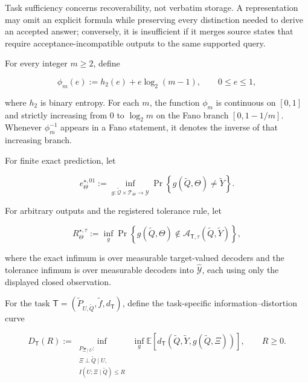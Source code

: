 \documentclass[10pt]{article} %
\providecommand{\1}{\mathbf{1}}  %
\theoremstyle{remark}
\theoremstyle{definition}
\begin{document}
Task sufficiency concerns recoverability, not verbatim storage. A representation may omit an explicit formula while preserving every distinction needed to derive an accepted answer; conversely, it is insufficient if it merges source states that require acceptance-incompatible outputs to the same supported query.

For every integer $m\geq2$, define

\begin{equation}
\phi_m(e)
:=
h_2(e)+e\log_2(m-1),
\qquad
0\leq e\leq1,
\label{eq:fano-curve}
\end{equation}

where $h_2$ is binary entropy. For each $m$, the function $\phi_m$ is continuous on $[0,1]$ and strictly increasing from $0$ to $\log_2m$ on the Fano branch $[0,1-1/m]$. Whenever $\phi_m^{-1}$ appears in a Fano statement, it denotes the inverse of that increasing branch.

For finite exact prediction, let

\begin{equation}
e_{\Theta}^{\star,01}
:=
\inf_{g:\widetilde{\mathcal Q}\times\mathcal T_\Theta\to\mathcal Y}
\Pr\!\left\{
g(\widetilde Q,\Theta)\neq\widetilde Y
\right\}.
\label{eq:representation-bayes-error}
\end{equation}

For arbitrary outputs and the registered tolerance rule, let

\begin{equation}
R_{\Theta}^{\star,\tau}
:=
\inf_g
\Pr\!\left\{
g(\widetilde Q,\Theta)
\notin
\mathcal A_{\mathsf T,\tau}(\widetilde Q,\widetilde Y)
\right\},
\label{eq:representation-tolerance-risk}
\end{equation}

where the exact infimum is over measurable target-valued decoders and the tolerance infimum is over measurable decoders into $\widehat{\mathcal Y}$, each using only the displayed closed observation.

For the task $\mathsf T=(\widetilde P_{U,\widetilde Q},\widetilde f,d_{\mathsf T})$, define the task-specific information--distortion curve

\begin{equation}
D_{\mathsf T}(R)
:=
\inf_{\substack{
 P_{\Xi\mid U}:\\
\Xi\perp\widetilde Q\mid U,\\
I(U;\Xi\mid\widetilde Q)\leq R
}}
\;
\inf_g
\mathbb E\!\left[
d_{\mathsf T}\!\left(
\widetilde Q,
\widetilde Y,
g(\widetilde Q,\Xi)
\right)
\right],
\qquad R\geq0.
\label{eq:task-information-distortion}
\end{equation}
\end{document}
